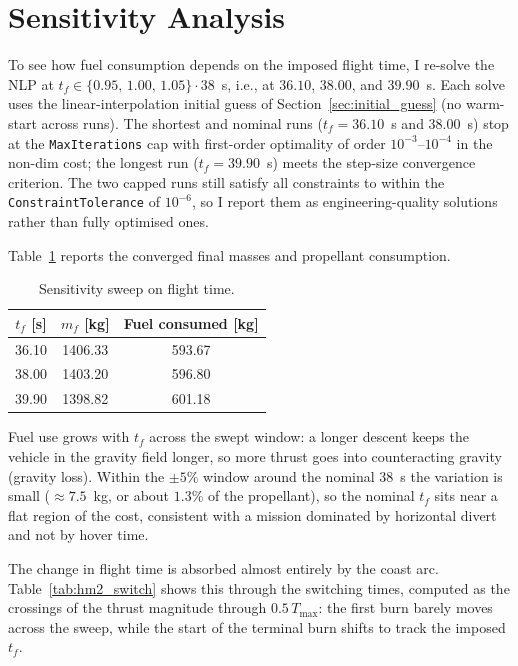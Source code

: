 \documentclass[../main.tex]{subfiles}
\begin{document}
\section{Sensitivity Analysis}\label{sec:sensitivity}

To see how fuel consumption depends on the imposed flight time, I re-solve the NLP at $t_f \in \{0.95,\, 1.00,\, 1.05\}\cdot 38$~s, i.e., at $36.10$, $38.00$, and $39.90$~s. Each solve uses the linear-interpolation initial guess of Section~\ref{sec:initial_guess} (no warm-start across runs). The shortest and nominal runs ($t_f = 36.10$~s and $38.00$~s) stop at the \texttt{MaxIterations} cap with first-order optimality of order $10^{-3}$--$10^{-4}$ in the non-dim cost; the longest run ($t_f = 39.90$~s) meets the step-size convergence criterion. The two capped runs still satisfy all constraints to within the \texttt{ConstraintTolerance} of $10^{-6}$, so I report them as engineering-quality solutions rather than fully optimised ones.

Table~\ref{tab:hm2_sweep} reports the converged final masses and propellant consumption.

\begin{table}[H]
\centering
\caption{Sensitivity sweep on flight time.}
\label{tab:hm2_sweep}
\begin{tabular}{ccc}
\toprule
$t_f$ [s] & $m_f$ [kg] & Fuel consumed [kg] \\
\midrule
36.10 & 1406.33 & 593.67 \\
38.00 & 1403.20 & 596.80 \\
39.90 & 1398.82 & 601.18 \\
\bottomrule
\end{tabular}
\end{table}

Fuel use grows with $t_f$ across the swept window: a longer descent keeps the vehicle in the gravity field longer, so more thrust goes into counteracting gravity (gravity loss). Within the $\pm 5\%$ window around the nominal $38$~s the variation is small ($\approx 7.5$~kg, or about $1.3\%$ of the propellant), so the nominal $t_f$ sits near a flat region of the cost, consistent with a mission dominated by horizontal divert and not by hover time.

The change in flight time is absorbed almost entirely by the coast arc. Table~\ref{tab:hm2_switch} shows this through the switching times, computed as the crossings of the thrust magnitude through $0.5\,T_{\max}$: the first burn barely moves across the sweep, while the start of the terminal burn shifts to track the imposed $t_f$.
\end{document}

